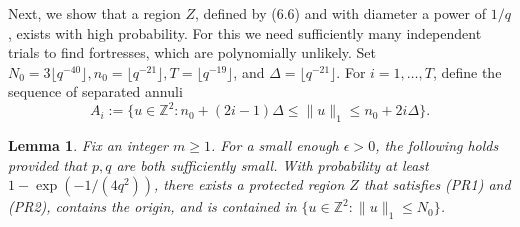 \documentclass{article}
\newcommand{\bZ}{{\mathbb Z}}
\numberwithin{equation}{section}
\newtheorem{lemma}[theorem]{Lemma}
\begin{document}
Next, we show that a region $Z$, defined by (6.6) and with diameter a power
of $1/q$, 
exists with high probability. For this we need sufficiently many independent trials to find fortresses, which are polynomially unlikely. 
Set $N_0 = 3\lfloor q^{-40}\rfloor, n_0 = \lfloor q^{-21} \rfloor, T = \lfloor q^{-19} \rfloor$, and $\Delta = \lfloor q^{-21} \rfloor$.
For $i = 1,\dots, T$, define the sequence of separated annuli
\[
A_i := \{u \in \bZ^2 : n_0 + (2i - 1)\Delta \leq \|u\|_1 \leq n_0 + 2i\Delta\}.
\]
\begin{lemma}\label{lem:PRexists}
    Fix an integer $m \geq 1$.
    For a small enough $\epsilon > 0$, the following holds provided that $p, q$ are both sufficiently small.
    With probability at least $1 - \exp(-1/(4q^2))$, there exists a protected region $Z$ that satisfies (PR1) and (PR2), contains the origin, and is contained in $\{u \in \bZ^2 : \|u\|_1 \leq N_0\}$.
\end{lemma}
\end{document}
